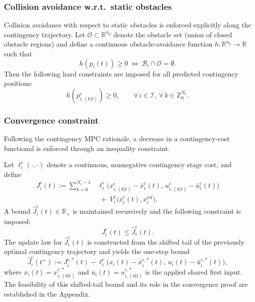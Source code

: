 \documentclass[twocolumn]{autart}
\begin{document}
\subsubsection{Collision avoidance w.r.t.\ static obstacles}
\label{subsec:CollisionAvoidance}
Collision avoidance with respect to static obstacles is enforced explicitly along the
contingency trajectory. Let $\mathcal{O}\subset\mathbb{R}^{n_p}$ denote the obstacle set (union of closed obstacle
regions) and define a continuous obstacle-avoidance function
$h:\mathbb{R}^{n_p}\rightarrow\mathbb{R}$ such that
\[
h(p_i(t))\ge 0 \ \Longleftrightarrow\ \mathcal{B}_i\cap \mathcal{O} = \emptyset.
\]
Then the following hard constraints are imposed for all predicted contingency positions:
\begin{equation}
h(p^{\mathrm{c}}_{i,(k|t)}) \ge 0,
\qquad \forall\, i\in\mathcal{I},\ \forall\, k\in\mathbb{Z}_0^{N_{\mathrm{c}}}.
\label{eq:static_obstacle_constraints}
\end{equation}

\subsubsection{Convergence constraint}
\label{subsec:dcmpc_convergence_constraint}
Following the contingency MPC rationale, a decrease in a contingency-cost functional is enforced through an inequality constraint.

Let $\ell_i^{\mathrm{c}}(\cdot,\cdot)$ denote a continuous, nonnegative contingency stage cost, and define
\begin{equation}
\begin{aligned}
J_i^{\mathrm{c}}(t)
:=
\sum_{k=0}^{N_{\mathrm{c}}-1}
&\ell_i^{\mathrm{c}}\!\big(x^{\mathrm{c}}_{i,(k|t)}-\bar{x}^{\mathrm{c}}_i(t),\,u^{\mathrm{c}}_{i,(k|t)}-\bar{u}^{\mathrm{c}}_i(t)\big) \\
&\;+\;
V_i^{\mathrm{c}}\!\big(\bar{x}^{\mathrm{c}}_i(t), x_i^{\mathrm{ref}}\big).
\end{aligned}
\label{eq:c_cost_def}
\end{equation}
A bound $\hat{J}_i^{\mathrm{c}}(t)\in\mathbb{R}_+$ is maintained recursively and the following constraint is imposed:
\begin{equation}
J_i^{\mathrm{c}}(t) \le \hat{J}_i^{\mathrm{c}}(t).
\label{eq:c_cost_decrease_constraint}
\end{equation}
The update law for $\hat{J}_i^{\mathrm{c}}(t)$ is constructed from the shifted tail of the previously optimal contingency trajectory and yields the one-step bound
\begin{equation}
\hat J_i^{\mathrm c}(t^+)
:=
J_i^{\mathrm c,\ast}(t)
-
\ell_i^{\mathrm{c}}\!\big(x_i(t)-\bar{x}_i^{\mathrm{c},\ast}(t),\,u_i(t)-\bar{u}_i^{\mathrm{c},\ast}(t)\big),
\label{eq:lyap_bound_update_main}
\end{equation}
where $x_i(t) = x_{i,(0|t)}^{c,\ast}$ and $u_i(t)=u^{\mathrm c,\ast}_{i,(0|t)}$ is the applied shared first input. The feasibility of this shifted-tail bound and its role in the convergence proof are established in the Appendix.
\end{document}
